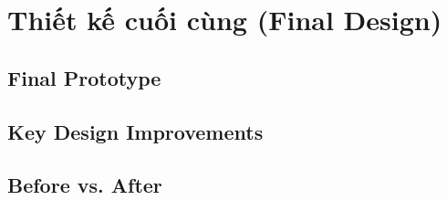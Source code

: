 \section{Thiết kế cuối cùng (Final Design)}

\subsection{Final Prototype}

\subsection{Key Design Improvements}

\subsection{Before vs. After}
